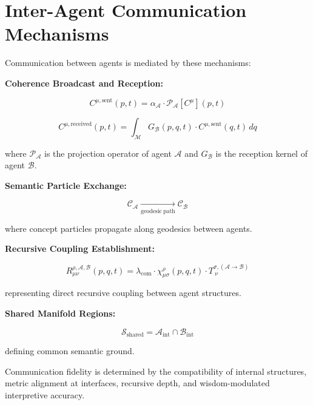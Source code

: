 \section{Inter-Agent Communication Mechanisms}
\label{14.3:inter_agent_communication_mechanisms}

Communication between agents is mediated by these mechanisms:

\textbf{Coherence Broadcast and Reception:}

\begin{equation}
C^{\mu, \mathrm{sent}}(p,t) = \alpha_{\mathcal{A}} \cdot \mathcal{P}_{\mathcal{A}}[C^\mu](p,t)
\end{equation}

\begin{equation}
C^{\mu, \mathrm{received}}(p,t) = \int_{\mathcal{M}} G_{\mathcal{B}}(p,q,t) \cdot C^{\mu, \mathrm{sent}}(q,t) \, dq
\end{equation}

where \(\mathcal{P}_{\mathcal{A}}\) is the projection operator of agent \(\mathcal{A}\) and \(G_{\mathcal{B}}\) is the reception kernel of agent \(\mathcal{B}\).


\textbf{Semantic Particle Exchange:}

\begin{equation}
\mathcal{C}_{\mathcal{A}} \xrightarrow[\mathrm{geodesic\ path}]{} \mathcal{C}_{\mathcal{B}}
\end{equation}

where concept particles propagate along geodesics between agents.


\textbf{Recursive Coupling Establishment:}

\begin{equation}
R_{\mu\nu}^{\rho, \mathcal{A},\mathcal{B}}(p, q, t) = \lambda_{\mathrm{com}} \cdot \chi^\rho_{\mu\sigma}(p, q, t) \cdot T_{\ \nu}^{\sigma, (\mathcal{A} \to \mathcal{B})}
\end{equation}

representing direct recursive coupling between agent structures.


\textbf{Shared Manifold Regions:}

\begin{equation}
\mathcal{S}_{\mathrm{shared}} = \mathcal{A}_{\mathrm{int}} \cap \mathcal{B}_{\mathrm{int}}
\end{equation}

defining common semantic ground.

Communication fidelity is determined by the compatibility of internal structures, metric alignment at interfaces, recursive depth, and wisdom-modulated interpretive accuracy. 